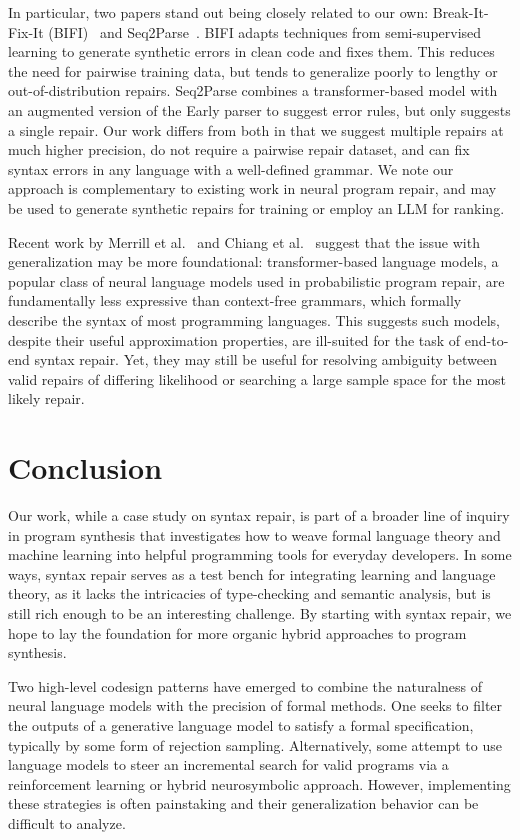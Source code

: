 \documentclass[sigplan,acmsmall,nonacm,screen]{acmart}\settopmatter{printfolios=false,printccs=false,printacmref=false}
\begin{document}
  In particular, two papers stand out being closely related to our own: Break-It-Fix-It (BIFI)~\cite{yasunaga2021break} and Seq2Parse~\cite{sakkas2022seq2parse}. BIFI adapts techniques from semi-supervised learning to generate synthetic errors in clean code and fixes them. This reduces the need for pairwise training data, but tends to generalize poorly to lengthy or out-of-distribution repairs. Seq2Parse combines a transformer-based model with an augmented version of the Early parser to suggest error rules, but only suggests a single repair. Our work differs from both in that we suggest multiple repairs at much higher precision, do not require a pairwise repair dataset, and can fix syntax errors in any language with a well-defined grammar. We note our approach is complementary to existing work in neural program repair, and may be used to generate synthetic repairs for training or employ an LLM for ranking.

  Recent work by Merrill et al.~\cite{merrill2022saturated} and Chiang et al.~\cite{chiang2023tighter} suggest that the issue with generalization may be more foundational: transformer-based language models, a popular class of neural language models used in probabilistic program repair, are fundamentally less expressive than context-free grammars, which formally describe the syntax of most programming languages. This suggests such models, despite their useful approximation properties, are ill-suited for the task of end-to-end syntax repair. Yet, they may still be useful for resolving ambiguity between valid repairs of differing likelihood or searching a large sample space for the most likely repair.

\clearpage\section{Conclusion}\label{sec:conclusion}

  Our work, while a case study on syntax repair, is part of a broader line of inquiry in program synthesis that investigates how to weave formal language theory and machine learning into helpful programming tools for everyday developers. In some ways, syntax repair serves as a test bench for integrating learning and language theory, as it lacks the intricacies of type-checking and semantic analysis, but is still rich enough to be an interesting challenge. By starting with syntax repair, we hope to lay the foundation for more organic hybrid approaches to program synthesis.

  Two high-level codesign patterns have emerged to combine the naturalness of neural language models with the precision of formal methods. One seeks to filter the outputs of a generative language model to satisfy a formal specification, typically by some form of rejection sampling. Alternatively, some attempt to use language models to steer an incremental search for valid programs via a reinforcement learning or hybrid neurosymbolic approach. However, implementing these strategies is often painstaking and their generalization behavior can be difficult to analyze.
\end{document}
